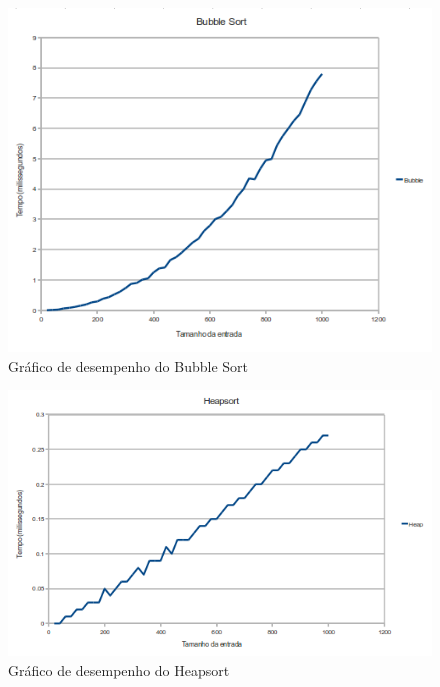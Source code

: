 \documentclass[10pt,a4paper]{article}
\begin{document}
\begin{figure}[ht]
\centering
\includegraphics[width=1.2\textwidth]{bubble.png}
\caption{Gráfico de desempenho do Bubble Sort}
\label{fig:bubble}
\end{figure}


\begin{figure}[ht]
\centering
\includegraphics[width=1.2\textwidth]{heap.png}
\caption{Gráfico de desempenho do Heapsort}
\label{fig:heap}
\end{figure}
\end{document}
